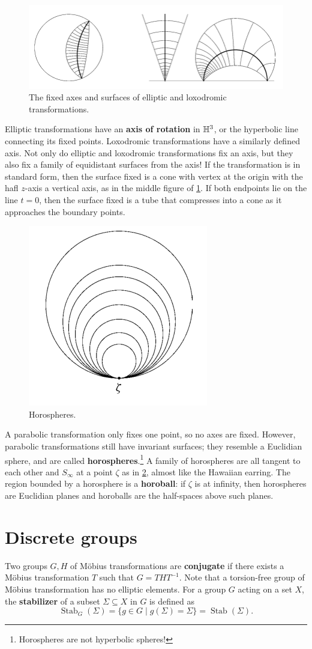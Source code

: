 \begin{figure}[H]
\centering
 \includegraphics[width=0.7\linewidth]{figures/hyp1.png}
\caption{The fixed axes and surfaces of elliptic and loxodromic transformations.} 
 \label{fix} 
\end{figure}
Elliptic transformations have an \textbf{axis of rotation} in $\mathbb{H}^3$, or the hyperbolic line connecting its fixed points. Loxodromic transformations have a similarly defined axis. Not only do elliptic and loxodromic transformations fix an axis, but they also fix a family of equidistant surfaces from the axis! If the transformation is in standard form, then the surface fixed is a cone with vertex at the origin with the hafl $z$-axis a vertical axis, as in the middle figure of \cref{fix}. If both endpoints lie on the line $t=0$, then the surface fixed is a tube that compresses into a cone as it approaches the boundary points.
\begin{figure}[H]
\centering
 \includegraphics[width=0.3\linewidth]{figures/hyp2.png}
\caption{Horospheres.} 
\label{horo} 
\end{figure}

A parabolic transformation only fixes one point, so no axes are fixed. However, parabolic transformations still have invariant surfaces; they resemble a Euclidian sphere, and are called \textbf{horospheres}.\footnote{Horospheres are not hyperbolic spheres!} A family of horospheres are all tangent to each other and $S_{\infty}$ at a point $\zeta$ as in \cref{horo}, almost like the Hawaiian earring. The region bounded by a horosphere is a \textbf{horoball}: if $\zeta$ is at infinity, then horospheres are Euclidian planes and horoballs are the half-spaces above such planes.

\section{Discrete groups} 
Two groups $G,H$ of M\"obius transformations are \textbf{conjugate} if there exists a M\"obius transformation $T$ such that $G=THT^{-1}$. Note that a torsion-free group of M\"obius transformation has no elliptic elements. For a group $G$ acting on a set $X$, the \textbf{stabilizer} of a subset $\Sigma \subseteq X$ in $G$ is defined as \[
    \operatorname{Stab}_G(\Sigma)= \{g \in G \mid g(\Sigma)=\Sigma\} =\operatorname{Stab}(\Sigma).
\] 
